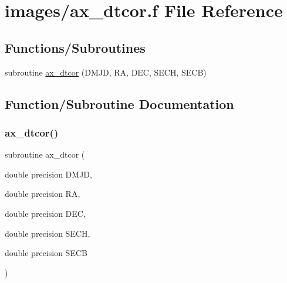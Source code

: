\hypertarget{ax__dtcor_8f}{}\section{images/ax\+\_\+dtcor.f File Reference}
\label{ax__dtcor_8f}
\subsection*{Functions/\+Subroutines}
\begin{DoxyCompactItemize}
\item 
subroutine \hyperlink{ax__dtcor_8f_a9c2a90a027097e8fab03640b6291fe90}{ax\+\_\+dtcor} (D\+M\+JD, RA, D\+EC, S\+E\+CH, S\+E\+CB)
\end{DoxyCompactItemize}


\subsection{Function/\+Subroutine Documentation}
\mbox{\label{ax__dtcor_8f_a9c2a90a027097e8fab03640b6291fe90}} 
\subsubsection{\texorpdfstring{ax\+\_\+dtcor()}{ax\_dtcor()}}
{\footnotesize\ttfamily subroutine ax\+\_\+dtcor (\begin{DoxyParamCaption}\item[{double precision}]{D\+M\+JD,  }\item[{double precision}]{RA,  }\item[{double precision}]{D\+EC,  }\item[{double precision}]{S\+E\+CH,  }\item[{double precision}]{S\+E\+CB }\end{DoxyParamCaption})}

